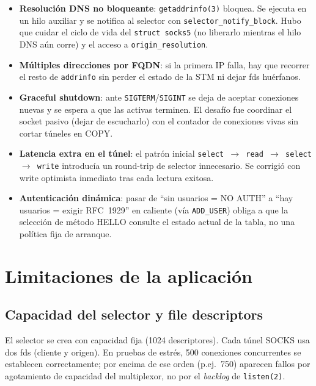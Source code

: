 \documentclass[12pt,a4paper]{article}
\begin{document}
\begin{itemize}
    \item \textbf{Resolución DNS no bloqueante}: \texttt{getaddrinfo(3)} bloquea.
          Se ejecuta en un hilo auxiliar y se notifica al selector con
          \texttt{selector\_notify\_block}. Hubo que cuidar el ciclo de vida del
          \texttt{struct socks5} (no liberarlo mientras el hilo DNS aún corre) y
          el acceso a \texttt{origin\_resolution}.
    \item \textbf{Múltiples direcciones por FQDN}: si la primera IP falla, hay que
          recorrer el resto de \texttt{addrinfo} sin perder el estado de la STM ni
          dejar fds huérfanos.
    \item \textbf{Graceful shutdown}: ante \texttt{SIGTERM}/\texttt{SIGINT} se deja
          de aceptar conexiones nuevas y se espera a que las activas terminen. El
          desafío fue coordinar el socket pasivo (dejar de escucharlo) con el
          contador de conexiones vivas sin cortar túneles en COPY.
    \item \textbf{Latencia extra en el túnel}: el patrón inicial
          \texttt{select $\rightarrow$ read $\rightarrow$ select $\rightarrow$ write}
          introducía un round-trip de selector innecesario. Se corrigió con write
          optimista inmediato tras cada lectura exitosa.
    \item \textbf{Autenticación dinámica}: pasar de ``sin usuarios = NO AUTH'' a
          ``hay usuarios = exigir RFC~1929'' en caliente (vía \texttt{ADD\_USER})
          obliga a que la selección de método HELLO consulte el estado actual de
          la tabla, no una política fija de arranque.
\end{itemize}

\section{Limitaciones de la aplicación}

\subsection{Capacidad del selector y file descriptors}

El selector se crea con capacidad fija (1024 descriptores). Cada túnel SOCKS usa
dos fds (cliente y origen). En pruebas de estrés, 500 conexiones concurrentes se
establecen correctamente; por encima de ese orden (p.ej.\ 750) aparecen fallos por
agotamiento de capacidad del multiplexor, no por el \textit{backlog} de
\texttt{listen(2)}.
\end{document}
